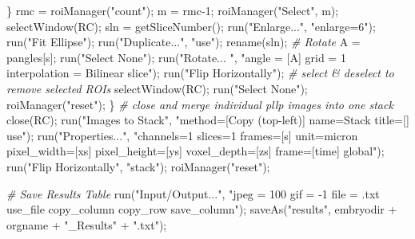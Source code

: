 \documentclass[10pt, b5paper, singlespacinge, twoside]{reedthesis} %
\newenvironment{Shaded}{}{}
\newcommand{\CommentTok}[1]{\textit{#1}}
\newcommand{\DecValTok}[1]{#1}
\newcommand{\FunctionTok}[1]{#1}
\newcommand{\NormalTok}[1]{#1}
\newcommand{\OtherTok}[1]{#1}
\newcommand{\SpecialCharTok}[1]{#1}
\newcommand{\StringTok}[1]{#1}
\theoremstyle{definition}
\theoremstyle{definition}
\theoremstyle{definition}
\theoremstyle{remark}
\begin{document}
\begin{Shaded}
\begin{Highlighting}[numbers=left,,]
\NormalTok{                \}}
\NormalTok{                rmc }\OtherTok{=} \FunctionTok{roiManager}\NormalTok{(}\StringTok{"count"}\NormalTok{);}
\NormalTok{                m }\OtherTok{=}\NormalTok{ rmc}\DecValTok{{-}1}\NormalTok{;}
                \FunctionTok{roiManager}\NormalTok{(}\StringTok{"Select"}\NormalTok{, m);}
                \FunctionTok{selectWindow}\NormalTok{(RC);}
\NormalTok{                sln }\OtherTok{=} \FunctionTok{getSliceNumber}\NormalTok{();}
                \FunctionTok{run}\NormalTok{(}\StringTok{"Enlarge..."}\NormalTok{, }\StringTok{"enlarge=6"}\NormalTok{);}
                \FunctionTok{run}\NormalTok{(}\StringTok{"Fit Ellipse"}\NormalTok{);}
                \FunctionTok{run}\NormalTok{(}\StringTok{"Duplicate..."}\NormalTok{, }\StringTok{"use"}\NormalTok{);}
                \FunctionTok{rename}\NormalTok{(sln);}
            \CommentTok{\#   Rotate}
\NormalTok{                A }\OtherTok{=}\NormalTok{ pangles[s];}
                \FunctionTok{run}\NormalTok{(}\StringTok{"Select None"}\NormalTok{);}
                \FunctionTok{run}\NormalTok{(}\StringTok{"Rotate... "}\NormalTok{, }\StringTok{"angle = [A] grid = 1 interpolation = Bilinear slice"}\NormalTok{);}
                \FunctionTok{run}\NormalTok{(}\StringTok{"Flip Horizontally"}\NormalTok{);}
            \CommentTok{\# select \& deselect to remove selected ROIs}
                \FunctionTok{selectWindow}\NormalTok{(RC);}
                \FunctionTok{run}\NormalTok{(}\StringTok{"Select None"}\NormalTok{);}
                \FunctionTok{roiManager}\NormalTok{(}\StringTok{"reset"}\NormalTok{);}
\NormalTok{            \}}
        \CommentTok{\#   close and merge individual pllp images into one stack}
            \FunctionTok{close}\NormalTok{(RC);}
            \FunctionTok{run}\NormalTok{(}\StringTok{"Images to Stack"}\NormalTok{, }\StringTok{"method=[Copy (top{-}left)] name=Stack title=[] use"}\NormalTok{);}
            \FunctionTok{run}\NormalTok{(}\StringTok{"Properties..."}\NormalTok{, }\StringTok{"channels=1 slices=1 frames=[s] unit=micron}
\StringTok{                pixel\_width=[xs] pixel\_height=[ys] voxel\_depth=[zs] frame=[time] global"}\NormalTok{);  }
            \FunctionTok{run}\NormalTok{(}\StringTok{"Flip Horizontally"}\NormalTok{, }\StringTok{"stack"}\NormalTok{);}
            \FunctionTok{roiManager}\NormalTok{(}\StringTok{"reset"}\NormalTok{);}
                
     \CommentTok{\#  Save Results Table}
      \FunctionTok{run}\NormalTok{(}\StringTok{"Input/Output..."}\NormalTok{, }\StringTok{"jpeg = 100 gif = {-}1 file = .txt use\_file copy\_column copy\_row save\_column"}\NormalTok{);}
            \FunctionTok{saveAs}\NormalTok{(}\StringTok{"results"}\NormalTok{, embryodir }\SpecialCharTok{+}\NormalTok{ orgname }\SpecialCharTok{+} \StringTok{"\_Results"} \SpecialCharTok{+} \StringTok{".txt"}\NormalTok{);}
\end{Highlighting}
\end{Shaded}
\normalsize
\end{document}
